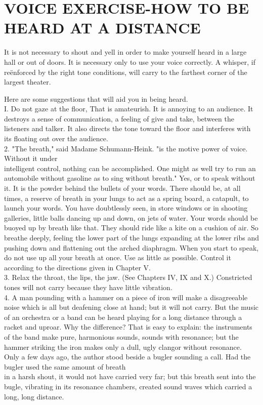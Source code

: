 \documentclass[10pt]{article}
\begin{document}
\section*{VOICE EXERCISE-HOW TO BE HEARD AT A DISTANCE}
It is not necessary to shout and yell in order to make yourself heard in a large hall or out of doors. It is necessary only to use your voice correctly. A whisper, if reënforced by the right tone conditions, will carry to the farthest corner of the largest theater.

Here are some suggestions that will aid you in being heard.\\
I. Do not gaze at the floor, That is amateurish. It is annoying to an audience. It destroys a sense of communication, a feeling of give and take, between the listeners and talker. It also directs the tone toward the floor and interferes with its floating out over the audience.\\
2. "The breath," said Madame Schumann-Heink. "is the motive power of voice. Without it under\\
intelligent control, nothing can be accomplished. One might as well try to run an automobile without gasoline as to sing without breath." Yes, or to speak without it. It is the powder behind the bullets of your words. There should be, at all times, a reserve of breath in your lungs to act as a spring board, a catapult, to launch your words. You have doubtlessly seen, in store windows or in shooting galleries, little balls dancing up and down, on jets of water. Your words should be buoyed up by breath like that. They should ride like a kite on a cushion of air. So breathe deeply, feeling the lower part of the lungs expanding at the lower ribs and pushing down and flattening out the arched diaphragm. When you start to speak, do not use up all your breath at once. Use as little as possible. Control it according to the directions given in Chapter V.\\
3. Relax the throat, the lips, the jaw. (See Chapters IV, IX and X.) Constricted tones will not carry because they have little vibration.\\
4. A man pounding with a hammer on a piece of iron will make a disagreeable noise which is all but deafening close at hand; but it will not carry. But the music of an orchestra or a band can be heard playing for a long distance through a racket and uproar. Why the difference? That is easy to explain: the instruments of the band make pure, harmonious sounds, sounds with resonance; but the hammer striking the iron makes only a dull, ugly clangor without resonance. Only a few days ago, the author stood beside a bugler sounding a call. Had the bugler used the same amount of breath\\
in a harsh shout, it would not have carried very far; but this breath sent into the bugle, vibrating in its resonance chambers, created sound waves which carried a long, long distance.
\end{document}
